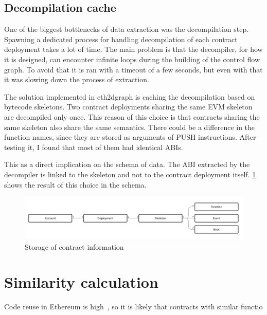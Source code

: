 \subsection{Decompilation cache}

One of the biggest bottlenecks of data extraction was the decompilation step. Spawning a dedicated process for handling decompilation of each contract deployment takes a lot of time. The main problem is that the decompiler, for how it is designed, can encounter infinite loops during the building of the control flow graph. To avoid that it is ran with a timeout of a few seconds, but even with that it was slowing down the process of extraction.

The solution implemented in eth2dgraph is caching the decompilation based on bytecode skeletons. Two contract deployments sharing the same EVM skeleton are decompiled only once. 
This reason of this choice is that contracts sharing the same skeleton also share the same semantics. There could be a difference in the function names, since they are stored as arguments of PUSH instructions. After testing it, I found that most of them had identical ABIs. 

This as a direct implication on the schema of data. The ABI extracted by the decompiler is linked to the skeleton and not to the contract deployment itself. \cref{fig:contracts-storage} shows the result of this choice in the schema.

\begin{figure}[H]
  \centering
  \includegraphics[width=1\textwidth]{Figures/methods/contracts-storage.jpg}
  \caption[Storage of contract information]{Storage of contract information}
  \label{fig:contracts-storage}
\end{figure}

\section{Similarity calculation}

 Code reuse in Ethereum is high~\cite{ethereum-sc-topology}, so it is likely that contracts with similar functio 





